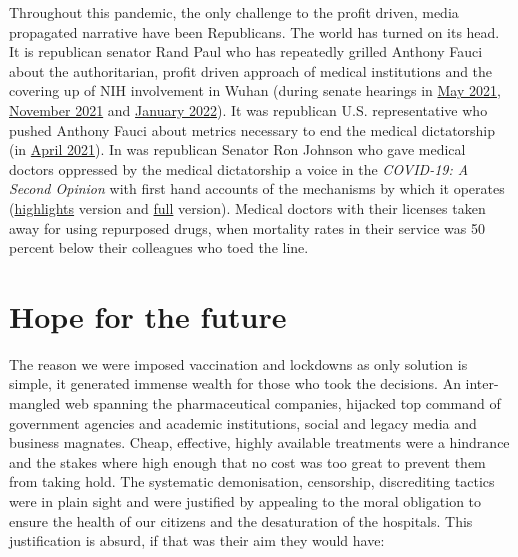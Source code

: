 \documentclass[11pt,a4paper,notitlepage]{report}
\begin{document}
Throughout this pandemic, the only challenge to the profit driven, media propagated narrative have been Republicans. The world has turned on its head. It is republican senator Rand Paul who has repeatedly grilled Anthony Fauci about the authoritarian, profit driven approach of medical institutions and the covering up of NIH involvement in Wuhan (during senate hearings in \href{https://www.youtube.com/watch?v=2MndwrOzDvo}{May 2021}, \href{https://www.youtube.com/watch?v=JBqXYpO1QpE}{November 2021} and \href{https://www.youtube.com/watch?v=kz7OGxb9X6E}{January 2022}). It was republican U.S. representative who pushed Anthony Fauci about metrics necessary to end the medical dictatorship (in \href{https://www.youtube.com/watch?v=2_MqHg4QVqI}{April 2021}). In was republican Senator Ron Johnson who gave medical doctors oppressed by the medical dictatorship a voice in the \textit{COVID-19: A Second Opinion} with first hand accounts of the mechanisms by which it operates (\href{https://www.youtube.com/watch?v=9jMONZMuS2U}{highlights} version and \href{https://rumble.com/vt62y6-covid-19-a-second-opinion.html}{full} version). Medical doctors with their licenses taken away for using repurposed drugs, when mortality rates in their service was 50 percent below their colleagues who toed the line.


\section*{Hope for the future}

The reason we were imposed vaccination and lockdowns as only solution is simple, it generated immense wealth for those who took the decisions. An inter-mangled web spanning the pharmaceutical companies, hijacked top command of government agencies and academic institutions, social and legacy media and business magnates. Cheap, effective, highly available treatments were a hindrance and the stakes where high enough that no cost was too great to prevent them from taking hold. The systematic demonisation, censorship, discrediting tactics were in plain sight and were justified by appealing to the moral obligation to ensure the health of our citizens and the desaturation of the hospitals. This justification is absurd, if that was their aim they would have:
\end{document}
